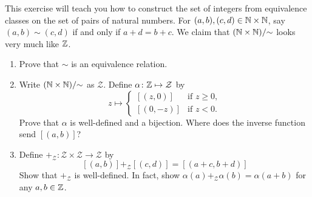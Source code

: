 \documentclass[../notes.tex]{subfiles}
\begin{document}
\begin{homework}
    This exercise will teach you how to construct the set of integers from equivalence classes on the set of pairs of natural numbers. For $(a, b), (c, d) \in \mathbb N \times \mathbb N$, say $(a, b) \sim (c, d)$ if and only if $a + d = b + c$. We claim that $(\mathbb N \times \mathbb N) /{\sim}$ looks very much like $\mathbb Z$.
    \begin{enumerate}[label=(\alph*)]
        \item Prove that $\sim$ is an equivalence relation.
        \item Write $(\mathbb N \times \mathbb N) /{\sim}$ as $\mathcal{Z}$. Define $\alpha\colon \mathbb Z \mapsto \mathcal{Z}$ by
        \[z \mapsto \begin{cases} [(z, 0)] & \text{if }z \geq 0, \\ [(0, -z)] & \text{if }z < 0. \end{cases}\]
        Prove that $\alpha$ is well-defined and a bijection. Where does the inverse function send $[(a,b)]$?
        \item Define $+_{\mathcal{Z}}\colon \mathcal{Z} \times \mathcal{Z} \to \mathcal{Z}$ by
        $$[(a, b)] +_{\mathcal{Z}} [(c, d)] = [(a + c, b + d)]$$
        Show that $+_{\mathcal{Z}}$ is well-defined. In fact, show $\alpha(a) +_{\mathcal{Z}} \alpha(b) = \alpha(a + b)$ for any $a,b\in\mathbb Z$.
    \end{enumerate}
\end{homework}
\end{document}
